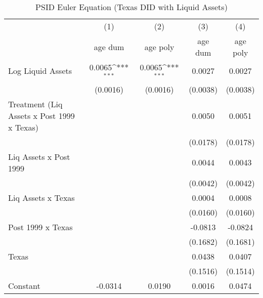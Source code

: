 {
\def\sym#1{\ifmmode^{#1}\else\(^{#1}\)\fi}
\begin{longtable}{l*{4}{c}}
\caption{PSID Euler Equation (Texas DID with Liquid Assets)}\\
\toprule\endfirsthead\midrule\endhead\midrule\endfoot\endlastfoot
                    &\multicolumn{1}{c}{(1)}&\multicolumn{1}{c}{(2)}&\multicolumn{1}{c}{(3)}&\multicolumn{1}{c}{(4)}\\
                    &\multicolumn{1}{c}{age dum}&\multicolumn{1}{c}{age poly}&\multicolumn{1}{c}{age dum}&\multicolumn{1}{c}{age poly}\\
\midrule
Log Liquid Assets   &      0.0065\sym{***}&      0.0065\sym{***}&      0.0027         &      0.0027         \\
                    &    (0.0016)         &    (0.0016)         &    (0.0038)         &    (0.0038)         \\
\addlinespace
Treatment (Liq Assets x Post 1999 x Texas)&                     &                     &      0.0050         &      0.0051         \\
                    &                     &                     &    (0.0178)         &    (0.0178)         \\
\addlinespace
Liq Assets x Post 1999&                     &                     &      0.0044         &      0.0043         \\
                    &                     &                     &    (0.0042)         &    (0.0042)         \\
\addlinespace
Liq Assets x Texas  &                     &                     &      0.0004         &      0.0008         \\
                    &                     &                     &    (0.0160)         &    (0.0160)         \\
\addlinespace
Post 1999 x Texas   &                     &                     &     -0.0813         &     -0.0824         \\
                    &                     &                     &    (0.1682)         &    (0.1681)         \\
\addlinespace
Texas               &                     &                     &      0.0438         &      0.0407         \\
                    &                     &                     &    (0.1516)         &    (0.1514)         \\
\addlinespace
Constant            &     -0.0314         &      0.0190         &      0.0016         &      0.0474         \\

\end{longtable}}
